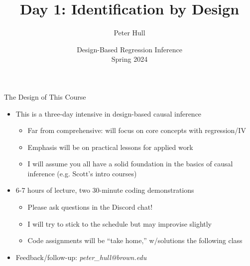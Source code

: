 \documentclass[11pt, english]{beamer}
\begin{document}
	\begin{frame}[noframenumbering]{}
		\vspace{0.5cm}
		\title[]{Day 1: Identification by Design}
		\author{Peter Hull}
		\date{Design-Based Regression Inference \\
		Spring 2024}
		\titlepage {\small{}\ }
		\thispagestyle{empty}
		\vspace{-30pt}
	\end{frame}

	\begin{frame}{The Design of This Course}
		\begin{itemize}
			\item This is a three-day intensive in design-based causal inference
				\smallskip
				\begin{itemize}
					\item Far from comprehensive: will focus on core concepts with
						regression/IV
						\smallskip

					\item Emphasis will be on practical lessons for applied work
						\smallskip

					\item I will assume you all have a solid foundation in the basics of causal
						inference (e.g. Scott's intro courses)
				\end{itemize}
				\bigskip
				\pause{}

			\item 6-7 hours of lecture, two 30-minute coding demonstrations
				\smallskip
				\begin{itemize}
					\item Please ask questions in the Discord chat!
						\smallskip

					\item I will try to stick to the schedule but may improvise slightly
						\smallskip

					\item Code assignments will be ``take home,'' w/solutions the
						following class
				\end{itemize}
				\bigskip
				\pause{}

			\item Feedback/follow-up: \emph{peter\_hull@brown.edu}
		\end{itemize}
	\end{frame}
\end{document}
